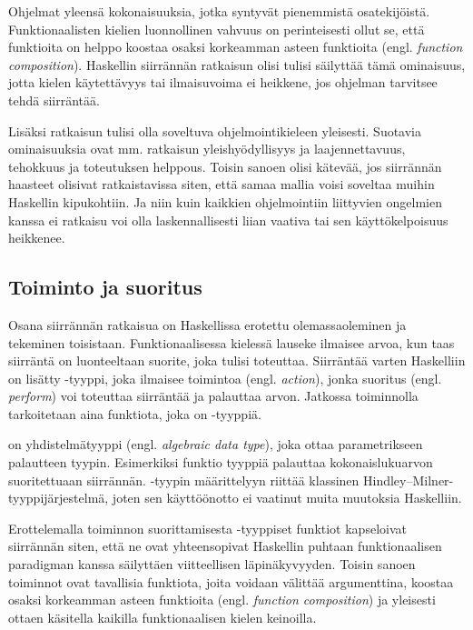 \documentclass[finnish]{tktltiki2}
\begin{document}
Ohjelmat yleensä kokonaisuuksia, jotka syntyvät pienemmistä osatekijöistä. Funktionaalisten kielien
luonnollinen vahvuus on perinteisesti ollut se, että funktioita on helppo koostaa osaksi korkeamman
asteen funktioita (engl. \emph{function composition}). Haskellin siirrännän ratkaisun olisi tulisi
säilyttää tämä ominaisuus, jotta kielen käytettävyys tai ilmaisuvoima ei heikkene, jos ohjelman
tarvitsee tehdä siirräntää.

Lisäksi ratkaisun tulisi olla soveltuva ohjelmointikieleen yleisesti. Suotavia ominaisuuksia ovat
mm. ratkaisun yleishyödyllisyys ja laajennettavuus, tehokkuus ja toteutuksen helppous. Toisin sanoen
olisi kätevää, jos siirrännän haasteet olisivat ratkaistavissa siten, että samaa mallia voisi
soveltaa muihin Haskellin kipukohtiin. Ja niin kuin kaikkien ohjelmointiin liittyvien ongelmien
kanssa ei ratkaisu voi olla laskennallisesti liian vaativa tai sen käyttökelpoisuus heikkenee.

\subsection{Toiminto ja suoritus}

Osana siirrännän ratkaisua on Haskellissa erotettu olemassaoleminen ja tekeminen toisistaan.
Funktionaalisessa kielessä lauseke ilmaisee arvoa, kun taas siirräntä on luonteeltaan suorite, joka
tulisi toteuttaa. Siirräntää varten Haskelliin on lisätty -tyyppi, joka ilmaisee toimintoa
(engl. \emph{action}), jonka suoritus (engl. \emph{perform}) voi toteuttaa siirräntää ja palauttaa
arvon. Jatkossa toiminnolla tarkoitetaan aina funktiota, joka on -tyyppiä.

 on yhdistelmätyyppi (engl. \emph{algebraic data type}), joka ottaa parametrikseen
palautteen tyypin. Esimerkiksi funktio tyyppiä  palauttaa kokonaislukuarvon
suoritettuaan siirrännän. -tyypin määrittelyyn riittää klassinen
Hindley--Milner-tyyppijärjestelmä, joten sen käyttöönotto ei vaatinut muita muutoksia Haskelliin.

Erottelemalla toiminnon suorittamisesta -tyyppiset funktiot kapseloivat siirrännän siten,
että ne ovat yhteensopivat Haskellin puhtaan funktionaalisen paradigman kanssa säilyttäen
viitteellisen läpinäkyvyyden. Toisin sanoen toiminnot ovat tavallisia funktiota, joita voidaan
välittää argumenttina, koostaa osaksi korkeamman asteen funktioita (engl. \emph{function
composition}) ja yleisesti ottaen käsitella kaikilla funktionaalisen kielen keinoilla.
\end{document}
